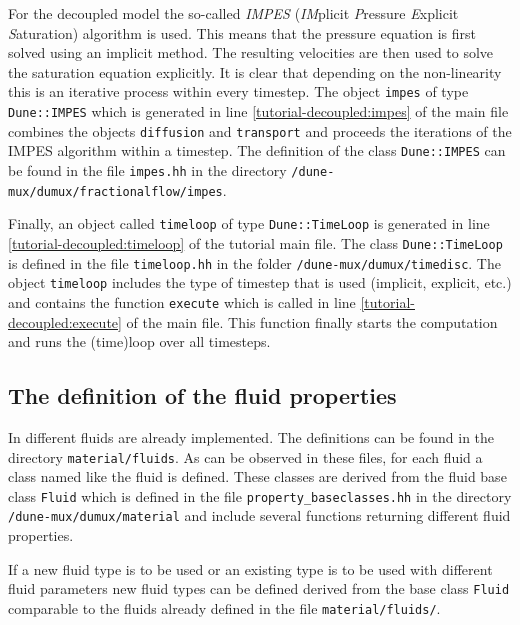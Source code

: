 For the decoupled model the so-called \textit{IMPES} (\textit{IM}plicit \textit{P}ressure \textit{E}xplicit \textit{S}aturation) algorithm is used. This means that the pressure equation is first solved using an implicit method. The resulting velocities are then used to solve the saturation equation explicitly. It is clear that depending on the non-linearity this is an iterative process within every timestep. The object \texttt{impes} of type \texttt{Dune::IMPES} which is generated in line \ref{tutorial-decoupled:impes} of the main file combines the objects \texttt{diffusion} and \texttt{transport} and proceeds the iterations of the IMPES algorithm within a timestep. The definition of the class \texttt{Dune::IMPES} can be found in the file \texttt{impes.hh} in the directory \texttt{/dune-mux/dumux/fractionalflow/impes}.

Finally, an object called \texttt{timeloop} of type \texttt{Dune::TimeLoop} is generated in line \ref{tutorial-decoupled:timeloop} of the tutorial main file. The class \texttt{Dune::TimeLoop} is defined in the file \texttt{timeloop.hh} in the folder \texttt{/dune-mux/dumux/timedisc}. The object \texttt{timeloop} includes the type of timestep that is used (implicit, explicit, etc.) and contains the function \texttt{execute} which is called in line \ref{tutorial-decoupled:execute} of the main file. This function finally starts the computation and runs the (time)loop over all timesteps.

\subsection{The definition of the fluid properties}\label{tutorial-decoupled:description-fluid-class}

In \Dumux different fluids are already implemented. The definitions can be found in the directory \texttt{material/fluids}. As can be observed in these files, for each fluid a class named like the fluid is defined. These classes are derived from the fluid base class \texttt{Fluid} which is defined in the file \texttt{property\_baseclasses.hh} in the directory \texttt{/dune-mux/dumux/material} and include several functions returning different fluid properties.

If a new fluid type is to be used or an existing type is to be used with different fluid parameters new fluid types can be defined derived from the base class \texttt{Fluid} comparable to the fluids already defined in the file \texttt{material/fluids/}.

